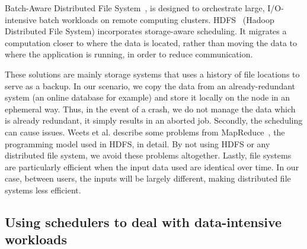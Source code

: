 \documentclass[sigconf,review,anonymous]{acmart}
\begin{document}
Batch-Aware Distributed File System~\cite{Explicit_Control_in_a_Batch-Aware_Distributed_File_System},
is designed to orchestrate large, I/O-intensive batch workloads on remote computing clusters.
HDFS~\cite{hdfs} (Hadoop Distributed File System)
incorporates storage-aware scheduling. 
It migrates a computation closer to where the data is
located, rather than moving the data to where the application is
running, in order to reduce communication.

These solutions are mainly storage systems that uses a history of file locations to serve as a backup.
In our scenario, we copy the data from an already-redundant system (an online database for example)
and store it locally on the node in an ephemeral way.
Thus, in the event of a crash, we do not manage the data which is already redundant, it simply results in an aborted job.
Secondly, the scheduling can cause issues. Weets et al. describe some problems from
MapReduce~\cite{issue_with_hdfs}, the programming model used in HDFS, in detail.
By not using HDFS or any distributed file system, we avoid these problems altogether. 
Lastly, file systems are particularly efficient when the input data used are identical over time.
In our case, between users, the inputs will be largely different, making distributed file systems less efficient.




\subsection{Using schedulers to deal with data-intensive workloads}
\end{document}
